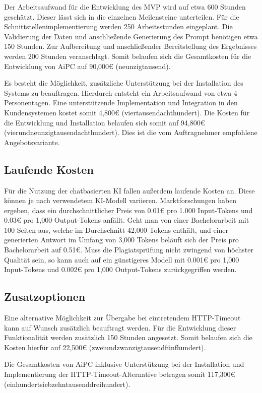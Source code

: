 Der Arbeitsaufwand für die Entwicklung des \ac{MVP} wird auf etwa 600 Stunden geschätzt.
Dieser lässt sich in die einzelnen Meilensteine unterteilen.
Für die Schnittstellenimplementierung werden 250 Arbeitsstunden eingeplant.
Die Validierung der Daten und anschließende Generierung des Prompt benötigen etwa 150 Stunden.
Zur Aufbereitung und anschließender Bereitstellung des Ergebnisses werden 200 Stunden veranschlagt.
Somit belaufen sich die Gesamtkosten für die Entwicklung von \ac{AiPC} auf 90,000\euro{} (neunzigtausend).

Es besteht die Möglichkeit, zusätzliche Unterstützung bei der Installation des Systems zu beauftragen.
Hierdurch entsteht ein Arbeitsaufwand von etwa 4 Personentagen.
Eine unterstützende Implementation und Integration in den Kundensystemen kostet somit 4,800\euro{} (viertausendachthundert).
Die Kosten für die Entwicklung und Installation belaufen sich somit auf 94,800\euro{} (vierundneunzigtausendachthundert).
Dies ist die vom Auftragnehmer empfohlene Angebotsvariante.

\subsection{Laufende Kosten}\label{subsec:laufende-kosten}
Für die Nutzung der chatbasierten \ac{KI} fallen außerdem laufende Kosten an.
Diese können je nach verwendetem \ac{KI}-Modell variieren.
Marktforschungen haben ergeben, dass ein durchschnittlicher Preis von 0.01\euro{} pro 1.000 Input-Tokens und 0.03\euro{} pro 1,000 Output-Tokens anfällt.
Geht man von einer Bachelorarbeit mit 100 Seiten aus, welche im Durchschnitt 42,000 Tokens enthält, und einer generierten Antwort im Umfang von 3,000 Tokens beläuft sich der Preis pro Bachelorarbeit auf 0.51\euro{}.
Muss die Plagiatsprüfung nicht zwingend von höchster Qualität sein, so kann auch auf ein günstigeres Modell mit 0.001\euro{} pro 1,000 Input-Tokens und 0.002\euro{} pro 1,000 Output-Tokens zurückgegriffen werden.

\subsection{Zusatzoptionen}\label{subsec:zusatzoptionen}
Eine alternative Möglichkeit zur Übergabe bei eintretendem HTTP-Timeout kann auf Wunsch zusätzlich beauftragt werden.
Für die Entwicklung dieser Funktionalität werden zusätzlich 150 Stunden angesetzt.
Somit belaufen sich die Kosten hierfür auf 22,500\euro{} (zweiundzwanzigtausendfünfhundert).

Die Gesamtkosten von \ac{AiPC} inklusive Unterstützung bei der Installation und Implementierung der HTTP-Timeout-Alternative betragen somit 117,300\euro{} (einhundertsiebzehntausenddreihundert).
